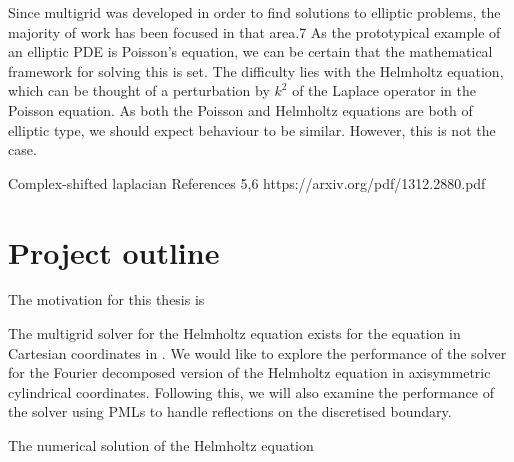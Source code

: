 Since multigrid was developed in order to find solutions to elliptic problems, the majority of work has been focused in that area.7
As the prototypical example of an elliptic PDE is Poisson's equation, we can be certain that the mathematical framework for solving this is set.
The difficulty lies with the Helmholtz equation, which can be thought of a perturbation by $k^2$ of the Laplace operator in the Poisson equation.
As both the Poisson and Helmholtz equations are both of elliptic type, we should expect behaviour to be similar.
However, this is not the case.

Complex-shifted laplacian 
References 5,6
https://arxiv.org/pdf/1312.2880.pdf







\section{Project outline}

\iffalse
What is each chapter doing? What do we hope to accomplish? 
\fi

The motivation for this thesis is 

The multigrid solver for the Helmholtz equation exists for the equation in Cartesian coordinates in \oomph.
We would like to explore the performance of the solver for the Fourier decomposed version of the Helmholtz equation in axisymmetric cylindrical coordinates.
Following this, we will also examine the performance of the solver using PMLs to handle reflections on the discretised boundary.

The numerical solution of the Helmholtz equation 
